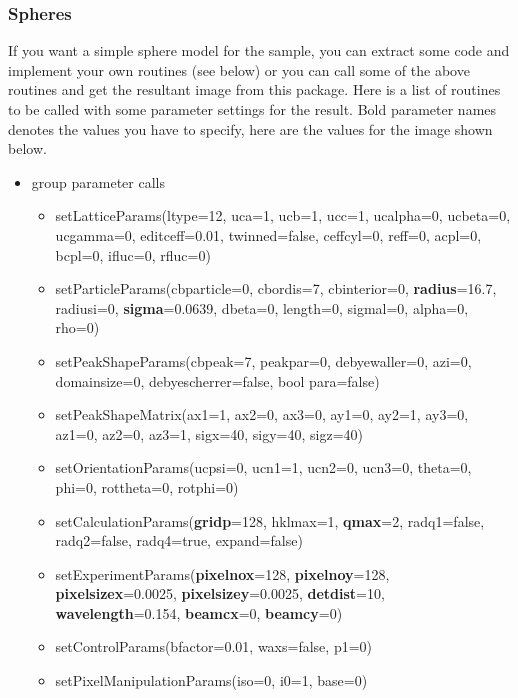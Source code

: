 \documentclass[11pt]{article} %
\begin{document}
\subsubsection{Spheres}

If you want a simple sphere model for the sample, you can extract some code and implement your own routines (see below) or you can call some of the above routines and get the resultant image from this package. Here is a list of routines to be called with some parameter settings for the result. Bold parameter names denotes the values you have to specify, here are the values for the image shown below.
\begin{itemize}
\item group parameter calls
\begin{itemize}\itemsep0pt
\item setLatticeParams(ltype=12, uca=1, ucb=1, ucc=1, ucalpha=0, ucbeta=0, ucgamma=0, editceff=0.01, twinned=false, ceffcyl=0, reff=0, acpl=0, bcpl=0, ifluc=0, rfluc=0)
\item setParticleParams(cbparticle=0, cbordis=7, cbinterior=0, {\bf radius}=16.7, radiusi=0, {\bf sigma}=0.0639, dbeta=0, length=0, sigmal=0, alpha=0, rho=0)
\item setPeakShapeParams(cbpeak=7, peakpar=0, debyewaller=0, azi=0, domainsize=0, debyescherrer=false, bool para=false)
\item setPeakShapeMatrix(ax1=1, ax2=0, ax3=0, ay1=0, ay2=1, ay3=0, az1=0, az2=0, az3=1, sigx=40, sigy=40, sigz=40)
\item setOrientationParams(ucpsi=0, ucn1=1, ucn2=0, ucn3=0, theta=0, phi=0, rottheta=0, rotphi=0)
\item setCalculationParams({\bf gridp}=128, hklmax=1, {\bf qmax}=2, radq1=false, radq2=false, radq4=true, expand=false)
\item setExperimentParams({\bf pixelnox}=128, {\bf pixelnoy}=128, {\bf pixelsizex}=0.0025, {\bf pixelsizey}=0.0025, {\bf detdist}=10, {\bf wavelength}=0.154, {\bf beamcx}=0, {\bf beamcy}=0)
\item setControlParams(bfactor=0.01, waxs=false, p1=0)
\item setPixelManipulationParams(iso=0, i0=1, base=0)
\end{itemize} %


\end{itemize}
\end{document}
